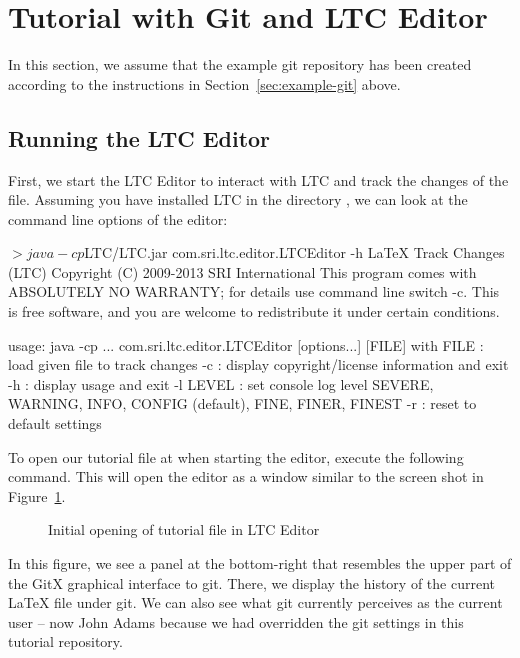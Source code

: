 \section{Tutorial with Git and LTC Editor} \label{sec:tutorial-git}

In this section, we assume that the example git repository has been created according to the instructions in Section~\ref{sec:example-git} above.

\subsection{Running the LTC Editor}

First, we start the LTC Editor to interact with LTC and track the changes of the file.  Assuming you have installed LTC in the directory , we can look at the command line options of the editor:
\begin{CodeVerbatim}[commandchars=\\\{\}]
$> java -cp $LTC/LTC.jar com.sri.ltc.editor.LTCEditor -h
LaTeX Track Changes (LTC)  Copyright (C) 2009-2013  SRI International
This program comes with ABSOLUTELY NO WARRANTY; for details use command line switch -c.
This is free software, and you are welcome to redistribute it under certain conditions.

usage: java -cp ... com.sri.ltc.editor.LTCEditor [options...] [FILE] 
with
 FILE     : load given file to track changes
 -c       : display copyright/license information and exit
 -h       : display usage and exit
 -l LEVEL : set console log level
            SEVERE, WARNING, INFO, CONFIG (default), FINE, FINER, FINEST
 -r       : reset to default settings
\end{CodeVerbatim}

To open our tutorial file at  when starting the editor, execute the following command.  This will open the editor as a window similar to the screen shot in Figure~\ref{fig:editor-open}.
\begin{figure}[t]
\centering
{}
\caption{Initial opening of tutorial file in LTC Editor} \label{fig:editor-open}
\end{figure}
In this figure, we see a panel at the bottom-right that resembles the upper part of the GitX graphical interface to git.  There, we display the history of the current LaTeX file under git.  We can also see what git currently perceives as the current user -- now John Adams because we had overridden the git settings in this tutorial repository.

